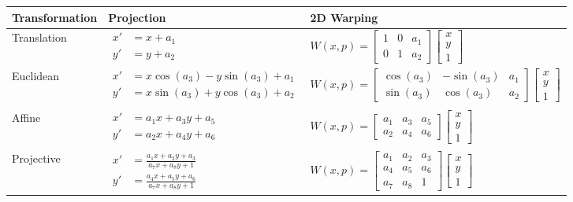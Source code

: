 \documentclass[10pt,a4paper]{scrartcl}
\begin{document}
\begin{multicols*}{2}
\small
\begin{tabular}{l|l|l}
Transformation&Projection&2D Warping\\\midrule
Translation&$\begin{aligned}
x'&=x+a_1\\
y'&=y+a_2
\end{aligned}$&$W(x,p)=\begin{bmatrix}
1&0&a_1\\0&1&a_2
\end{bmatrix}\begin{bmatrix}
x\\y\\1
\end{bmatrix}$\\\midrule
Euclidean&$\begin{aligned}
x'&=x\cos(a_3)-y\sin(a_3)+a_1\\
y'&=x\sin(a_3)+y\cos(a_3)+a_2\\
\end{aligned}$&$W(x,p)=\begin{bmatrix}
\cos(a_3)& -\sin(a_3) &a_1\\\sin(a_3)&\cos(a_3)&a_2
\end{bmatrix}\begin{bmatrix}
x\\y\\1
\end{bmatrix}$\\\midrule
Affine&$\begin{aligned}
x'&=a_1x+a_3y+a_5\\
y'&=a_2x+a_4y+a_6\\
\end{aligned}$&$W(x,p)=\begin{bmatrix}
a_1&a_3&a_5\\a_2&a_4&a_6
\end{bmatrix}\begin{bmatrix}
x\\y\\1
\end{bmatrix}$\\\midrule
Projective&$\begin{aligned}
x'&=\frac{a_1x+a_2y+a_3}{a_7x+a_8y+1}\\
y'&=\frac{a_4x+a_5y+a_6}{a_7x+a_8y+1}
\end{aligned}$&$W(x,p)=\begin{bmatrix}
a_1&a_2&a_3\\a_4&a_5&a_6\\a_7&a_8&1
\end{bmatrix}\begin{bmatrix}
x\\y\\1
\end{bmatrix}$
\end{tabular}
\normalsize


\end{multicols*}
\end{document}
